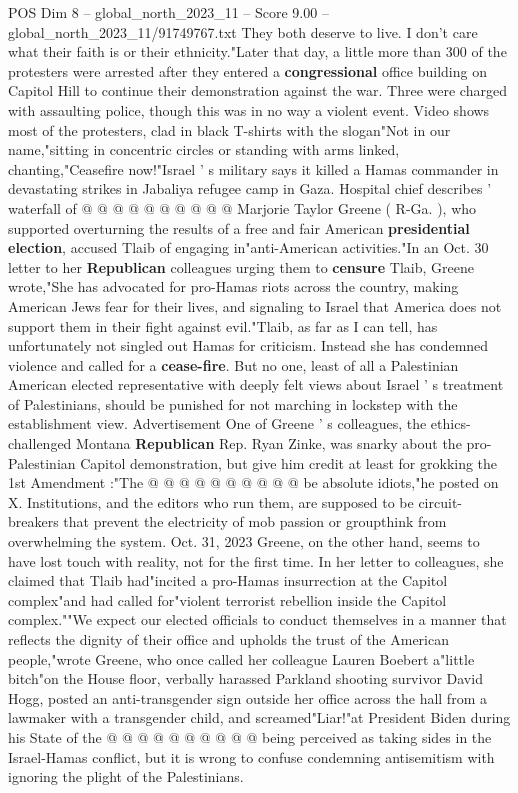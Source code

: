 \begin{textsample}{POS Dim 8 – global\_north\_2023\_11 – Score 9.00 – global\_north\_2023\_11/91749767.txt}
They both deserve to live.
I don't care what their faith is or their ethnicity."Later that day, a little more than 300 of the protesters were arrested after they entered a \textbf{congressional} office building on Capitol Hill to continue their demonstration against the war.
Three were charged with assaulting police, though this was in no way a violent event.
Video shows most of the protesters, clad in black T-shirts with the slogan"Not in our name,"sitting in concentric circles or standing with arms linked, chanting,"Ceasefire now!"Israel ' s military says it killed a Hamas commander in devastating strikes in Jabaliya refugee camp in Gaza.
Hospital chief describes ' waterfall of @ @ @ @ @ @ @ @ @ @ Marjorie Taylor Greene ( R-Ga. ), who supported overturning the results of a free and fair American \textbf{presidential} \textbf{election}, accused Tlaib of engaging in"anti-American activities."In an Oct. 30 letter to her \textbf{Republican} colleagues urging them to \textbf{censure} Tlaib, Greene wrote,"She has advocated for pro-Hamas riots across the country, making American Jews fear for their lives, and signaling to Israel that America does not support them in their fight against evil."Tlaib, as far as I can tell, has unfortunately not singled out Hamas for criticism.
Instead she has condemned violence and called for a \textbf{cease-fire}.
But no one, least of all a Palestinian American elected representative with deeply felt views about Israel ' s treatment of Palestinians, should be punished for not marching in lockstep with the establishment view.
Advertisement One of Greene ' s colleagues, the ethics-challenged Montana \textbf{Republican} Rep.
Ryan Zinke, was snarky about the pro-Palestinian Capitol demonstration, but give him credit at least for grokking the 1st Amendment :"The @ @ @ @ @ @ @ @ @ @ be absolute idiots,"he posted on X.
Institutions, and the editors who run them, are supposed to be circuit-breakers that prevent the electricity of mob passion or groupthink from overwhelming the system.
Oct. 31, 2023 Greene, on the other hand, seems to have lost touch with reality, not for the first time.
In her letter to colleagues, she claimed that Tlaib had"incited a pro-Hamas insurrection at the Capitol complex"and had called for"violent terrorist rebellion inside the Capitol complex.""We expect our elected officials to conduct themselves in a manner that reflects the dignity of their office and upholds the trust of the American people,"wrote Greene, who once called her colleague Lauren Boebert a"little bitch"on the House floor, verbally harassed Parkland shooting survivor David Hogg, posted an anti-transgender sign outside her office across the hall from a lawmaker with a transgender child, and screamed"Liar!"at President Biden during his State of the @ @ @ @ @ @ @ @ @ @ being perceived as taking sides in the Israel-Hamas conflict, but it is wrong to confuse condemning antisemitism with ignoring the plight of the Palestinians.

\end{textsample}
